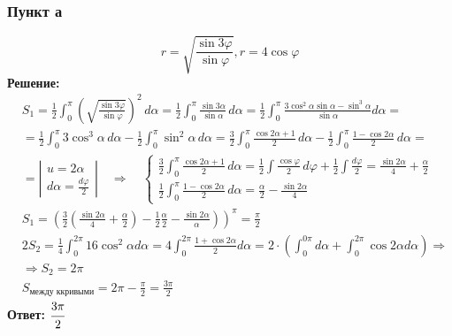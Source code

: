 \subsubsection*{Пункт а}
$$r=\sqrt{\frac{\sin 3 \varphi}{\sin \varphi}}, r=4 \cos \varphi$$
\textbf{Решение:} 
$$
\begin{aligned}
& S_1=\frac{1}{2} \int_0^\pi \left(\sqrt{\frac{\sin 3 \varphi}{\sin \varphi}}\right)^2 \, d \alpha
=\frac{1}{2} \int_0^\pi \frac{\sin 3 \alpha}{\sin \alpha} \, d \alpha
=\frac{1}{2} \int_0^\pi \frac{3 \cos ^2 \alpha \sin \alpha-\sin ^3 \alpha}{\sin \alpha} d \alpha= \\
& =\frac{1}{2} \int_0^\pi 3 \cos ^3 \alpha \, d \alpha - \frac{1}{2} \int_0^\pi \sin ^2 \alpha \, d \alpha
=\frac{3}{2} \int_0^\pi \frac{\cos 2 \alpha+1}{2} \, d \alpha - \frac{1}{2} \int_0^\pi \frac{1-\cos 2 \alpha}{2} \, d \alpha= \\
& = \left | 
\begin{array}{c}
u = 2\alpha \\ d \alpha = \frac{d\varphi}{2}
\end{array}
\right | \quad \Rightarrow \quad \begin{cases}
    \frac{3}{2} \int_0^\pi \frac{\cos 2 \alpha+1}{2} \, d \alpha = \frac{1}{2} \int \frac{\cos \varphi}{2} \, d \varphi+\frac{1}{2} \int \frac{d \varphi}{2}=\frac{\sin 2 \alpha}{4}+\frac{\alpha}{2} \\
    \frac{1}{2} \int_0^\pi \frac{1-\cos 2 \alpha}{2} \, d \alpha= \frac{\alpha}{2}-\frac{\sin 2 \alpha}{4}
\end{cases} \\
& \left.S_1=\left(\frac{3}{2}\left(\frac{\sin 2 \alpha}{4}+\frac{\alpha}{2}\right)-\frac{1}{2} \frac{\alpha}{2}-\frac{\sin 2 \alpha}{\alpha}\right)\right)^\pi=\frac{\pi}{2} \\
& 2 S_2=\frac{1}{4} \int_0^{2 \pi} 16 \cos ^2 \alpha d \alpha=4 \int_0^{2 \pi} \frac{1+\cos 2 \alpha}{2} d \alpha=2 \cdot\left(\int_0^{0 \pi} d \alpha+\int_0^{2 \pi} \cos 2 \alpha d \alpha\right) \Rightarrow \\
& \Rightarrow S_2=2 \pi \\
& S_{\text{между ккривыми}}=2 \pi-\frac{\pi}{2}=\frac{3 \pi}{2}
\end{aligned}
$$
\textbf{Ответ:} $\cfrac{3\pi}{2}$
